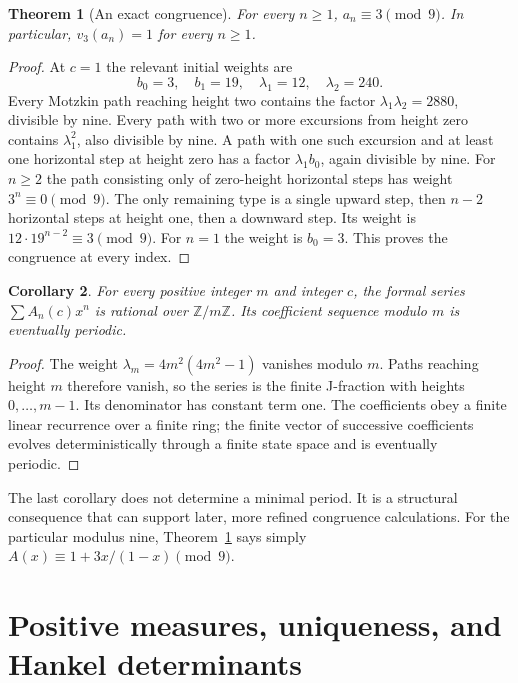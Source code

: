 \documentclass[11pt]{article}
\newtheorem{theorem}{Theorem}[section]
\newtheorem{corollary}[theorem]{Corollary}
\theoremstyle{definition}
\theoremstyle{remark}
\newcommand{\Z}{\mathbb Z}
\begin{document}
\begin{theorem}[An exact congruence]\label{pou:thm:mod9}
For every $n\ge1$, $a_n\equiv3\pmod9$.  In particular,
$v_3(a_n)=1$ for every $n\ge1$.
\end{theorem}
\begin{proof}
At $c=1$ the relevant initial weights are
\[
 b_0=3,\quad b_1=19,\quad \lambda_1=12,\quad \lambda_2=240.
\]
Every Motzkin path reaching height two contains the factor
$\lambda_1\lambda_2=2880$, divisible by nine.
Every path with two or more excursions from height zero contains
$\lambda_1^2$, also divisible by nine.  A path with one such excursion and
at least one horizontal step at height zero has a factor
$\lambda_1b_0$, again divisible by nine.
For $n\ge2$ the path consisting only of zero-height horizontal steps has
weight $3^n\equiv0\pmod9$.  The only remaining type is a single upward
step, then $n-2$ horizontal steps at height one, then a downward step.
Its weight is $12\cdot19^{n-2}\equiv3\pmod9$.
For $n=1$ the weight is $b_0=3$.  This proves the congruence at every index.
\end{proof}

\begin{corollary}\label{pou:cor:modrational}
For every positive integer $m$ and integer $c$, the formal series
$\sum A_n(c)x^n$ is rational over $\Z/m\Z$.  Its coefficient sequence
modulo $m$ is eventually periodic.
\end{corollary}
\begin{proof}
The weight $\lambda_m=4m^2(4m^2-1)$ vanishes modulo $m$.
Paths reaching height $m$ therefore vanish, so the series is the finite
J-fraction with heights $0,\ldots,m-1$.  Its denominator has constant term
one.  The coefficients obey a finite linear recurrence over a finite ring;
the finite vector of successive coefficients evolves deterministically
through a finite state space and is eventually periodic.
\end{proof}

The last corollary does not determine a minimal period.  It is a structural
consequence that can support later, more refined congruence calculations.
For the particular modulus nine, Theorem~\ref{pou:thm:mod9} says simply
$A(x)\equiv1+3x/(1-x)\pmod9$.

\section{Positive measures, uniqueness, and Hankel determinants}\label{pou:sec:moments}
\end{document}
